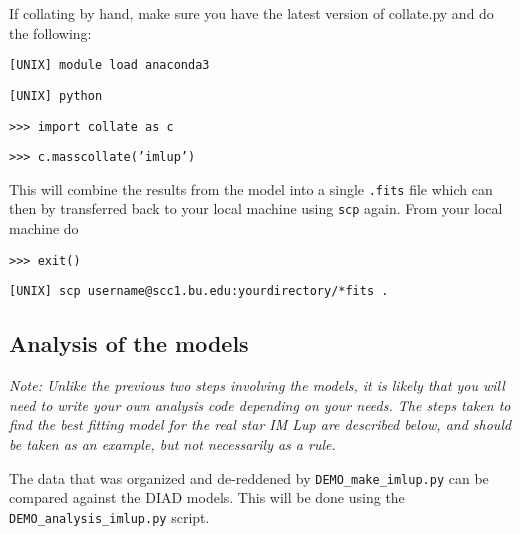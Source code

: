 \documentclass{article}
\begin{document}


\noindent If collating by hand, make sure you have the latest version of collate.py and do the following:


\vspace{2mm}
\texttt{[UNIX] module load anaconda3}
\vspace{2mm}

\vspace{2mm}
\texttt{[UNIX] python} 
\vspace{2mm}

\vspace{2mm}
\texttt{>>> import collate as c}

\texttt{>>> c.masscollate('imlup')}
\vspace{2mm}

\noindent This will combine the results from the model into a single  \texttt{.fits} file which can then by transferred back to your local machine using \texttt{scp} again.  From your local machine do

\vspace{2mm}
\texttt{>>> exit()}
\vspace{2mm}

\vspace{2mm}
\texttt{[UNIX] scp username@scc1.bu.edu:yourdirectory/*fits .}
\vspace{2mm}


\subsection{Analysis of the models}

\textit{Note: Unlike the previous two steps involving the models, it is likely that you will need to write your own analysis code depending on your needs. The steps taken to find the best fitting model for the real star IM Lup are described below, and should be taken as an example, but not necessarily as a rule.}
\vspace{2mm}

\noindent The data that was organized and de-reddened by \texttt{DEMO\_make\_imlup.py} can be compared against the DIAD models. This will be done using the \texttt{DEMO\_analysis\_imlup.py} script. 
\end{document}
